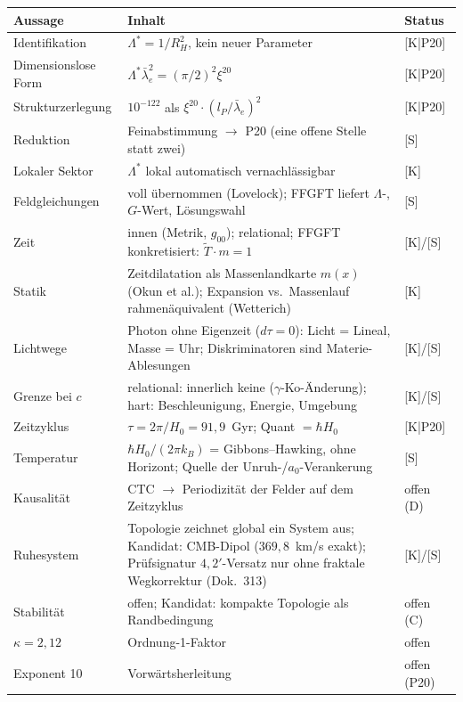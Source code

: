 \begin{center}
\begin{tabular}{lp{6.5cm}l}
\toprule
Aussage & Inhalt & Status \\
\midrule
Identifikation & $\Lambda^{*} = 1/R_H^2$, kein neuer Parameter
  & [K|P20] \\
Dimensionslose Form & $\Lambda^{*}\bar\lambda_e^2 = (\pi/2)^2\xi^{20}$
  & [K|P20] \\
Strukturzerlegung & $10^{-122}$ als $\xi^{20}\cdot(l_P/\bar\lambda_e)^2$
  & [K|P20] \\
Reduktion & Feinabstimmung $\to$ P20 (eine offene Stelle statt zwei)
  & [S] \\
Lokaler Sektor & $\Lambda^{*}$ lokal automatisch vernachlässigbar
  & [K] \\
Feldgleichungen & voll übernommen (Lovelock); FFGFT liefert
  $\Lambda$-, $G$-Wert, Lösungswahl & [S] \\
Zeit & innen (Metrik, $g_{00}$); relational; FFGFT konkretisiert:
  $\tilde T \cdot m = 1$ & [K]/[S] \\
Statik & Zeitdilatation als Massenlandkarte $m(x)$ (Okun et al.);
  Expansion vs.\ Massenlauf rahmenäquivalent (Wetterich) & [K] \\
Lichtwege & Photon ohne Eigenzeit ($d\tau=0$): Licht = Lineal,
  Masse = Uhr; Diskriminatoren sind Materie-Ablesungen & [K]/[S] \\
Grenze bei $c$ & relational: innerlich keine ($\gamma$-Ko-Änderung);
  hart: Beschleunigung, Energie, Umgebung & [K]/[S] \\
Zeitzyklus & $\tau = 2\pi/H_0 = 91{,}9$~Gyr; Quant $= \hbar H_0$
  & [K|P20] \\
Temperatur & $\hbar H_0/(2\pi k_B)$ = Gibbons--Hawking, ohne
  Horizont; Quelle der Unruh-/$a_0$-Verankerung & [S] \\
Kausalität & CTC $\to$ Periodizität der Felder auf dem Zeitzyklus
  & offen (D) \\
Ruhesystem & Topologie zeichnet global ein System aus; Kandidat:
  CMB-Dipol ($369{,}8$~km/s exakt); Prüfsignatur $4{,}2'$-Versatz
  nur ohne fraktale Wegkorrektur (Dok.~313) & [K]/[S] \\
Stabilität & offen; Kandidat: kompakte Topologie als Randbedingung
  & offen (C) \\
$\kappa = 2{,}12$ & Ordnung-1-Faktor & offen \\
Exponent 10 & Vorwärtsherleitung & offen (P20) \\
\bottomrule
\end{tabular}
\end{center}

